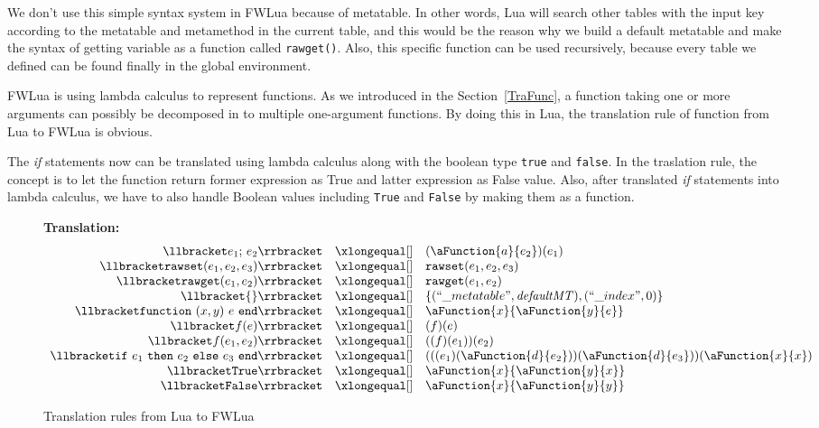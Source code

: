 We don't use this simple syntax system in FWLua because of metatable. In other words, Lua will search other tables with the input key according to the metatable and metamethod in the current table, and this would be the reason why we build a default metatable and make the syntax of getting variable as a function called {\tt rawget()}. Also, this specific function can be used recursively, because every table we defined can be found finally in the global environment.


FWLua is using lambda calculus to represent functions. As we introduced in the Section~\ref{TraFunc}, a function taking one or more arguments can possibly be decomposed in to multiple one-argument functions. By doing this in Lua, the translation rule of function from Lua to FWLua is obvious.

The {\it if} statements now can be translated using lambda calculus along with the boolean type {\tt true} and {\tt false}. In the traslation rule, the concept is to let the function return former expression as True and latter expression as False value. Also, after translated {\it if} statements into lambda calculus, we have to also handle Boolean values including {\tt True} and {\tt False} by making them as a function.


\begin{figure}
\caption{Translation rules from Lua to FWLua}

{\bf Translation:~~~    } 
\label{fig:translation}
\[
\begin{array}{rclcl}
\translate{e_1{\tt ;}~e_2}{(\aFunction{a}{e_2})(e_1)}
\translate{{\tt rawset}(e_1,e_2,e_3)}{{\tt rawset}(e_1,e_2,e_3)}
\translate{{\tt rawget}(e_1,e_2)}{{\tt rawget}(e_1,e_2)}
\translate{
    \{\}
}{
   \{(``\_metatable", {\it defaultMT}),(``\_index", 0)\}  
}

\translate{{\tt function}~(x,y)~e~{\tt end}}{\aFunction{x}{\aFunction{y}{e}}}
\translate{f(e)}{(f)(e)}
\translate{f(e_1,e_2)}{((f)(e_1))(e_2)}
\translate{
    {\tt if}~e_1~{\tt then}~e_2~{\tt else}~e_3~{\tt end}
}{
    (((e_1)(\aFunction{d}{e_2}))(\aFunction{d}{e_3}))(\aFunction{x}{x})
}
\translate{\tt True}{\aFunction{x}{\aFunction{y}{x}}}
\translate{\tt False}{\aFunction{x}{\aFunction{y}{y}}}

\end{array}
\]
\end{figure}
